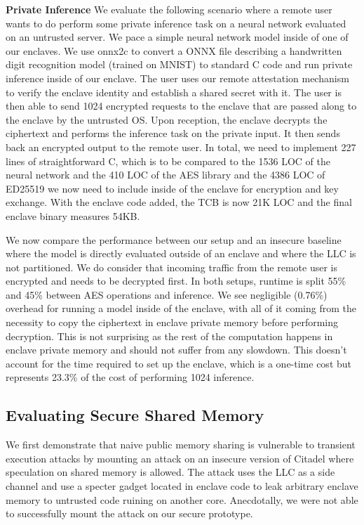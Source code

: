 \noindent\textbf{Private Inference}
\label{sec:evalprivateinference}
We evaluate the following scenario where a remote user wants to do perform some private inference task on a neural network evaluated on an untrusted server.
We pace a simple neural network model inside of one of our enclaves.
We use onnx2c \cite{onnx2cgithub} to convert a ONNX file describing a handwritten digit recognition model (trained on MNIST) to standard C code and run private inference inside of our enclave.
The user uses our remote attestation mechanism to verify the enclave identity and establish a shared secret with it.
The user is then able to send 1024 encrypted requests to the enclave that are passed along to the enclave by the untrusted OS.
Upon reception, the enclave decrypts the ciphertext and performs the inference task on the private input.
It then sends back an encrypted output to the remote user.
In total, we need to implement 227 lines of straightforward C, which is to be compared to the 1536 LOC of the neural network and the 410 LOC of the AES library and the 4386 LOC of ED25519 we now need to include inside of the enclave for encryption and key exchange.
With the enclave code added, the TCB is now 21K LOC and the final enclave binary measures 54KB.

We now compare the performance between our setup and an insecure baseline where the model is directly evaluated outside of an enclave and where the LLC is not partitioned. We do consider that incoming traffic from the remote user is encrypted and needs to be decrypted first.
In both setups, runtime is split 55\% and 45\% between AES operations and inference.
We see negligible (0.76\%) overhead for running a model inside of the enclave, with all of it coming from the necessity to copy the ciphertext in enclave private memory before performing decryption.
This is not surprising as the rest of the computation happens in enclave private memory and should not suffer from any slowdown.
This doesn't account for the time required to set up the enclave, which is a one-time cost but represents 23.3\% of the cost of performing 1024 inference.

\subsection{Evaluating Secure Shared Memory}

We first demonstrate that naive public memory sharing is vulnerable to transient execution attacks by mounting an attack on an insecure version of Citadel where speculation on shared memory is allowed. 
The attack uses the LLC as a side channel and use a specter gadget located in enclave code to leak arbitrary enclave memory to untrusted code ruining on another core. Anecdotally, we were not able to successfully mount the attack on our secure prototype. 

